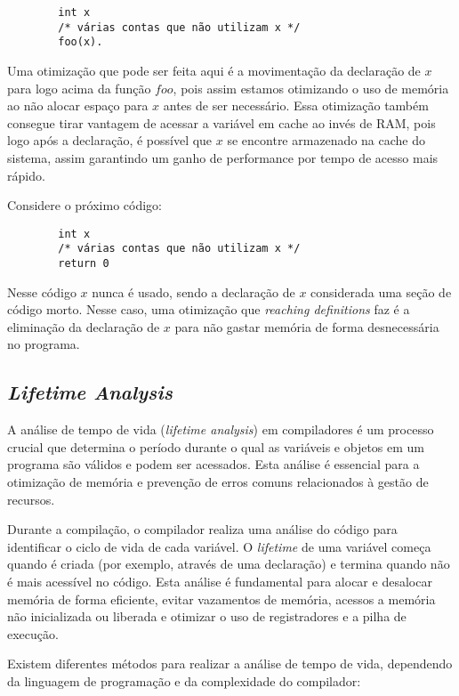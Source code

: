 \documentclass{article}
\begin{document}
    \begin{verbatim}
        int x
        /* várias contas que não utilizam x */
        foo(x).
    \end{verbatim}

    Uma otimização que pode ser feita aqui é a movimentação da declaração de $x$ para logo acima da função $foo$, pois assim estamos
    otimizando o uso de memória ao não alocar espaço para $x$ antes de ser necessário. Essa otimização também consegue tirar vantagem
    de acessar a variável em cache ao invés de RAM, pois logo após a declaração, é possível que $x$ se encontre armazenado na
    cache do sistema, assim garantindo um ganho de performance por tempo de acesso mais rápido.

    Considere o próximo código:

    \begin{verbatim}
        int x
        /* várias contas que não utilizam x */
        return 0
    \end{verbatim}

    Nesse código $x$ nunca é usado, sendo a declaração de $x$ considerada uma seção de código morto.
    Nesse caso, uma otimização que \emph{reaching definitions} faz é a eliminação da declaração de $x$ para não gastar memória
    de forma desnecessária no programa.

    \subsection*{\emph{Lifetime Analysis}}

    A análise de tempo de vida (\textit{lifetime analysis}) em compiladores é um processo crucial que determina o
    período durante o qual as variáveis e objetos em um programa são válidos e podem ser acessados. Esta análise é
    essencial para a otimização de memória e prevenção de erros comuns relacionados à gestão de recursos.

    Durante a compilação, o compilador realiza uma análise do código para identificar o ciclo de vida
    de cada variável. O \textit{lifetime} de uma variável começa quando é criada (por exemplo, através de uma declaração)
    e termina quando não é mais acessível no código. Esta análise é fundamental para
    alocar e desalocar memória de forma eficiente, evitar vazamentos de memória, acessos a memória não
    inicializada ou liberada e otimizar o uso de registradores e a pilha de execução.

    Existem diferentes métodos para realizar a análise de tempo de vida, dependendo da linguagem de programação e da complexidade do compilador:
\end{document}
